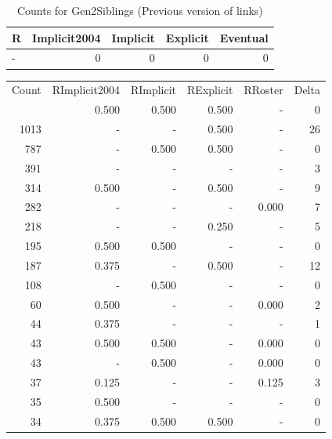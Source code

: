 \documentclass[a4paper]{article}\usepackage{graphicx, color}
\begin{document}
\begin{table}[ht]
\centering
{\large
\begin{tabular}{lrrrr}
  \hline
R & Implicit2004 & Implicit & Explicit & Eventual \\ 
  \hline
- &   0 &   0 &   0 &   0 \\ 
   \hline
\end{tabular}
}
\caption{Counts for Gen2Siblings (Previous version of links)} 
\end{table}



\begin{table}[ht]
\centering
\begin{tabular}{rrrrrr}
  \hline
Count & RImplicit2004 & RImplicit & RExplicit & RRoster & Delta \\ 
  \rowcolor{goodColor}  \hline
1192 & 0.500 & 0.500 & 0.500 & - & 0 \\ 
   \rowcolor{sosoColor} 1013 & - & - & 0.500 & - & 26 \\ 
   \rowcolor{goodColor} 787 & - & 0.500 & 0.500 & - & 0 \\ 
   \rowcolor{nullColor} 391 & - & - & - & - & 3 \\ 
   \rowcolor{sosoColor} 314 & 0.500 & - & 0.500 & - & 9 \\ 
   \rowcolor{nullColor} 282 & - & - & - & 0.000 & 7 \\ 
   \rowcolor{sosoColor} 218 & - & - & 0.250 & - & 5 \\ 
  195 & 0.500 & 0.500 & - & - & 0 \\ 
   \rowcolor{sosoColor} 187 & 0.375 & - & 0.500 & - & 12 \\ 
  108 & - & 0.500 & - & - & 0 \\ 
   \rowcolor{nullColor} 60 & 0.500 & - & - & 0.000 & 2 \\ 
   \rowcolor{nullColor} 44 & 0.375 & - & - & - & 1 \\ 
  43 & 0.500 & 0.500 & - & 0.000 & 0 \\ 
  43 & - & 0.500 & - & 0.000 & 0 \\ 
   \rowcolor{nullColor} 37 & 0.125 & - & - & 0.125 & 3 \\ 
   \rowcolor{nullColor} 35 & 0.500 & - & - & - & 0 \\ 
   \rowcolor{goodColor} 34 & 0.375 & 0.500 & 0.500 & - & 0 \\ 

\end{tabular}
\end{table}
\end{document}
